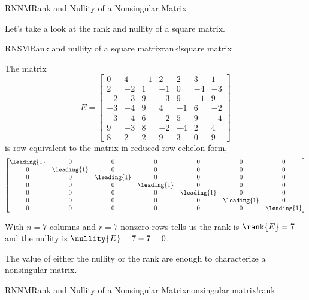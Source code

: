 \begin{subsect}{RNNM}{Rank and Nullity of a Nonsingular Matrix}
%
\begin{para}Let's take a look at the rank and nullity of a square matrix.\end{para}
%
\begin{example}{RNSM}{Rank and nullity of a square matrix}{rank!square matrix}
\begin{para}The matrix
%
\begin{equation*}
E=\begin{bmatrix}
0 & 4 & -1 & 2 & 2 & 3 & 1\\
2 & -2 & 1 & -1 & 0 & -4 & -3\\
-2 & -3 & 9 & -3 & 9 & -1 & 9\\
-3 & -4 & 9 & 4 & -1 & 6 & -2\\
-3 & -4 & 6 & -2 & 5 & 9 & -4\\
9 & -3 & 8 & -2 & -4 & 2 & 4\\
8 & 2 & 2 & 9 & 3 & 0 & 9
\end{bmatrix}
\end{equation*}
%
is row-equivalent to the matrix in reduced row-echelon form,
%
\begin{equation*}
\begin{bmatrix}
\leading{1} & 0 & 0 & 0 & 0 & 0 & 0\\
0 & \leading{1} & 0 & 0 & 0 & 0 & 0\\
0 & 0 & \leading{1} & 0 & 0 & 0 & 0\\
0 & 0 & 0 & \leading{1} & 0 & 0 & 0\\
0 & 0 & 0 & 0 & \leading{1} & 0 & 0\\
0 & 0 & 0 & 0 & 0 & \leading{1} & 0\\
0 & 0 & 0 & 0 & 0 & 0 & \leading{1}
\end{bmatrix}
\end{equation*}
\end{para}
%
\begin{para}With $n=7$ columns and $r=7$ nonzero rows  tells us the rank is $\rank{E}=7$ and the nullity is $\nullity{E}=7-7=0$.\end{para}
\end{example}
%
\begin{para}The value of either the nullity or the rank are enough to characterize a nonsingular matrix.\end{para}
%
\begin{theorem}{RNNM}{Rank and Nullity of a Nonsingular Matrix}{nonsingular matrix!rank}

\end{theorem}
\end{subsect}
